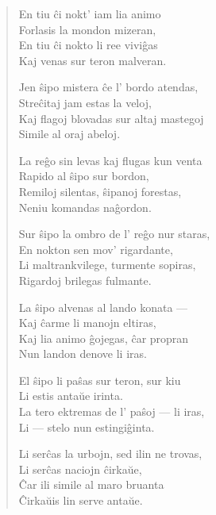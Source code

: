 \begin{verse}
                  \vin   En tiu \^ci nokt' iam lia animo\\
                  Forlasis la mondon mizeran,\\
                  En tiu \^ci nokto li ree vivi\^gas\\
                  Kaj venas sur teron malveran.

                  \vin   Jen \^sipo mistera \^ce l' bordo atendas,\\
                  Stre\^citaj jam estas la veloj,\\
                  Kaj flagoj blovadas sur altaj mastegoj\\
                  Simile al oraj abeloj.

                   \vin  La re\^go sin levas kaj flugas kun venta\\
                  Rapido al \^sipo sur bordon,\\
                  Remiloj silentas, \^sipanoj forestas,\\
                  Neniu komandas na\^gordon.

                  \vin   Sur \^sipo la ombro de l' re\^go nur staras,\\
                  En nokton sen mov' rigardante,\\
                  Li maltrankvilege, turmente sopiras,\\
                  Rigardoj brilegas fulmante.

                  \vin   La \^sipo alvenas al lando konata ---\\
                  Kaj \^carme li manojn eltiras,\\
                  Kaj lia animo \^gojegas, \^car propran\\
                  Nun landon denove li iras.

                  \vin   El \^sipo li pa\^sas sur teron, sur kiu\\
                  Li estis anta\u ue irinta.\\
                  La tero ektremas de l' pa\^soj --- li iras,\\
                  Li --- stelo nun estingi\^ginta.

                  \vin   Li ser\^cas la urbojn, sed ilin ne trovas,\\
                  Li ser\^cas naciojn \^cirka\u ue,\\
                  \^Car ili simile al maro bruanta\\
                  \^Cirka\u uis lin serve anta\u ue.


\end{verse}
